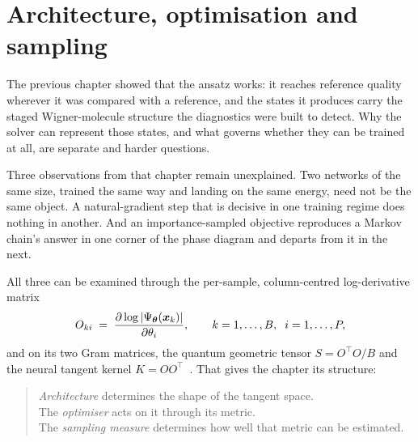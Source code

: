 %
\graphicspath{{../results/figures/results/}{../results/figures/results/kernel/}{../results/figures/}}
\chapter{Architecture, optimisation and sampling}
\label{ch:kernel}

The previous chapter showed that the ansatz works: it reaches reference quality wherever it was
compared with a reference, and the states it produces carry the staged Wigner-molecule structure the
diagnostics were built to detect. Why the solver can represent those states, and what
governs whether they can be trained at all, are separate and harder questions.

Three observations from that chapter remain unexplained. Two networks of the same size,
trained the same way and landing on the same energy, need not be the same object. A
natural-gradient step that is decisive in one training regime does nothing in another. And
an importance-sampled objective reproduces a Markov chain's answer in one corner of the
phase diagram and departs from it in the next.

All three can be examined through the per-sample, column-centred log-derivative matrix
\begin{equation}
  O_{ki} \;=\; \frac{\partial \log|\Psi_{\bm{\theta}}(\bm{x}_k)|}{\partial \theta_i},
  \qquad k=1,\dots,B,\;\; i=1,\dots,P,
  \label{eq:kernel-O}
\end{equation}
and on its two Gram matrices, the quantum geometric tensor $S = O^{\!\top}O / B$ and the
neural tangent kernel $K = OO^{\!\top}$~\cite{JacotEtAl2018-NTK,StokesEtAl2020-QuantumNaturalGradient}.
That gives the chapter its structure:

\begin{quote}
\emph{Architecture} determines the shape of the tangent space.\\
The \emph{optimiser} acts on it through its metric.\\
The \emph{sampling measure} determines how well that metric can be estimated.
\end{quote}


